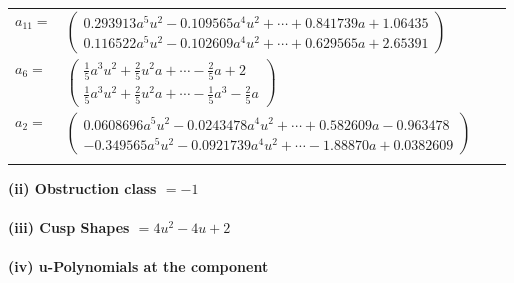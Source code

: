 \documentclass[1p]{elsarticle_modified}
\theoremstyle{definition}
\begin{document}
\begin{tabular}{m{7pt} m{180pt} m{7pt} m{180pt} }
\flushright $a_{11}=$&$\begin{pmatrix}0.293913 a^{5} u^{2}-0.109565 a^{4} u^{2}+\cdots+0.841739 a+1.06435\\0.116522 a^{5} u^{2}-0.102609 a^{4} u^{2}+\cdots+0.629565 a+2.65391\end{pmatrix}$ \\
\flushright $a_{6}=$&$\begin{pmatrix}\frac{1}{5} a^3 u^2+\frac{2}{5} u^2 a+\cdots-\frac{2}{5} a+2\\\frac{1}{5} a^3 u^2+\frac{2}{5} u^2 a+\cdots-\frac{1}{5} a^3-\frac{2}{5} a\end{pmatrix}$ \\
\flushright $a_{2}=$&$\begin{pmatrix}0.0608696 a^{5} u^{2}-0.0243478 a^{4} u^{2}+\cdots+0.582609 a-0.963478\\-0.349565 a^{5} u^{2}-0.0921739 a^{4} u^{2}+\cdots-1.88870 a+0.0382609\end{pmatrix}$\\&\end{tabular}
\flushleft \textbf{(ii) Obstruction class $= -1$}\\~\\
\flushleft \textbf{(iii) Cusp Shapes $= 4 u^2-4 u+2$}\\~\\
\newpage\renewcommand{\arraystretch}{1}
\flushleft \textbf{(iv) u-Polynomials at the component}\newline \\
\end{document}
